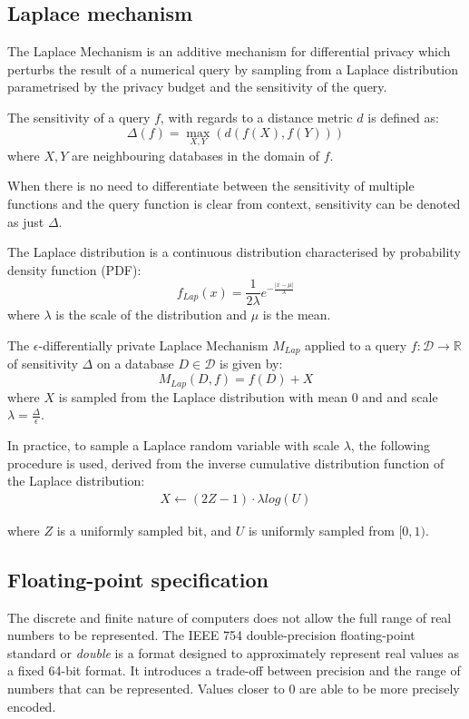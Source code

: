 \documentclass[orivec,envcountsame]{llncs}
\begin{document}
\subsection{Laplace mechanism}

The Laplace Mechanism is an additive mechanism for differential privacy which perturbs the result of a numerical query by sampling from a Laplace distribution parametrised by the privacy budget and the sensitivity of the query.

\begin{definition}
The sensitivity of a query $f$, with regards to a distance metric $d$ is defined as:
\large $$\Delta(f) = \max_{X,Y}(d(f(X), f(Y)))$$
\normalsize where $X, Y$ are neighbouring databases in the domain of $f$.
\end{definition}

When there is no need to differentiate between the sensitivity of multiple functions and the query function is clear from context, sensitivity can be denoted as just $\Delta$.

\begin{definition}
The Laplace distribution is a continuous distribution characterised by probability density function (PDF):
\large $$f_{Lap}(x) = \frac{1}{2\lambda}e^{-\frac{|x - \mu|}{\lambda}}$$
\normalsize where $\lambda$ is the scale of the distribution and $\mu$ is the mean.
\end{definition}


\begin{definition}
The $\epsilon$-differentially private Laplace Mechanism $M_{Lap}$ applied to a query $f: \mathcal{D} \rightarrow \mathbb{R}$ of sensitivity $\Delta$ on a database $D \in \mathcal{D}$ is given by:
\large $$ M_{Lap}(D, f) = f(D) + X $$
\normalsize where $X$ is sampled from the Laplace distribution with mean 0 and and scale $\lambda = \frac{\Delta}{\epsilon}$.
\end{definition}


In practice, to sample a Laplace random variable with scale $\lambda$, the following procedure is used, derived from the inverse cumulative distribution function of the Laplace distribution:
\begin{eqnarray}
X \leftarrow (2Z - 1) \cdot \lambda log(U) \label{eq:lap}
\end{eqnarray}

where $Z$ is a uniformly sampled bit, and $U$ is uniformly sampled from $[0, 1)$.

\subsection{Floating-point specification}
The discrete and finite nature of computers does not allow the full range of real numbers to be represented. The IEEE 754 double-precision floating-point standard or \textit{double} is a format designed to approximately represent real values as a fixed 64-bit format. It introduces a trade-off between precision and the range of numbers that can be represented. Values closer to 0 are able to be more precisely encoded.
\end{document}
